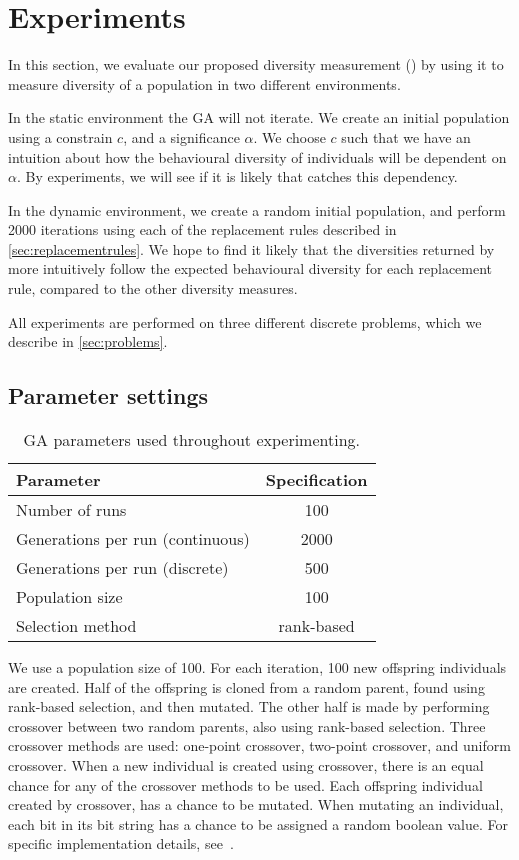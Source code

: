 \section{Experiments}
In this section, we evaluate our proposed diversity measurement (\dia) by using it to measure diversity of a population in two different environments.

In the static environment the GA will not iterate.
We create an initial population using a constrain $c$, and a significance $\alpha$.
We choose $c$ such that we have an intuition about how the behavioural diversity of individuals will be dependent on $\alpha$.
By experiments, we will see if it is likely that \dia{} catches this dependency.

In the dynamic environment, we create a random initial population, and perform 2000 iterations using each of the 
replacement rules described in \cref{sec:replacementrules}.
We hope to find it likely that the diversities returned by \dia more intuitively follow the expected behavioural diversity for each replacement rule, compared to the other diversity measures.

All experiments are performed on three different discrete problems, which we describe in \cref{sec:problems}.

\subsection{Parameter settings}

\begin{table}
  \centering
  \begin{tabular}{l S}
    \toprule
    Parameter & {Specification} \\
    \midrule
    Number of runs & 100 \\
    Generations per run (continuous) & 2000 \\
    Generations per run (discrete) & 500 \\
    Population size & 100 \\
    Selection method & {rank-based} \\
    \bottomrule
  \end{tabular}
  \caption{GA parameters used throughout experimenting.}
  \label{tab:gaparam}
\end{table}

We use a population size of 100. For each iteration, 100 new offspring individuals are created. Half of the offspring is cloned from a random parent, found using rank-based selection, and then mutated. The other half is made by performing crossover between two random parents, also using rank-based selection.
Three crossover methods are used: one-point crossover, two-point crossover, and uniform crossover. When a new individual is created using crossover, there is an equal chance for any of the crossover methods to be used. 
Each offspring individual created by crossover, has a  chance to be mutated.
When mutating an individual, each bit in its bit string has a  chance to be assigned a random boolean value.
For specific implementation details, see~\cite{mbm:kmc:ekoGA}.




